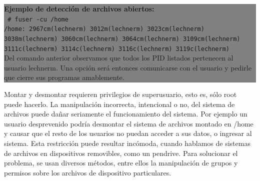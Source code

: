 \documentclass[12pt]{article}
\begin{document}
\colorbox{grey}{\parbox[t]{0.95\linewidth}{ \vspace*{0.5cm} { 
{\bf Ejemplo de detección de archivos abiertos: } \\
{\tt
\# fuser -cu /home \\ 
/home:                2967cm(lechnerm)  3012m(lechnerm)  3023cm(lechnerm) \\
 3038m(lechnerm)  3060cm(lechnerm)  3064cm(lechnerm)  3109cm(lechnerm) \\ 
3111c(lechnerm)  3114c(lechnerm)  3116c(lechnerm)  3119c(lechnerm)  \\
}
Del comando anterior observamos que todos los PID listados pertenecen al 
usuario lechnerm. Una opción será entonces comunicarse con el usuario y 
pedirle que cierre sus programas amablemente. 
} \vspace*{0.5cm} } } 



Montar y desmontar requieren privilegios de superusuario, esto es, sólo 
root puede hacerlo. La manipulación incorrecta, intencional o no, del 
sistema de archivos puede dañar seriamente el funcionamiento del sistema. 
Por ejemplo un usuario desprevenido podría desmontar el sistema de archivos
montado en /home y causar que el resto de los usuarios no puedan acceder 
a sus datos, o ingresar al sistema. Esta restricción puede resultar 
incómoda, cuando hablamos de sistemas de archivos en dispositivos
removibles, como un pendrive. Para solucionar el problema, se usan 
diversos métodos, entre ellos la manipulación de grupos y permisos sobre 
los archivos de dispositivo particulares. 


\end{document}
